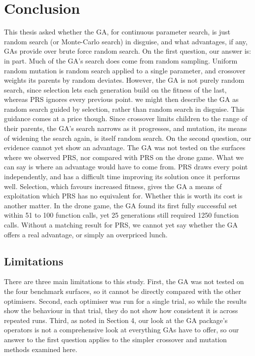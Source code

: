 \documentclass[
  a4paper,
]{article}
\newcommand{\+}{\phantom{-}}
\begin{document}
\section{Conclusion}\label{conclusion}

This thesis asked whether the GA, for continuous parameter search, is
just random search (or Monte-Carlo search) in disguise, and what
advantages, if any, GAs provide over brute force random search. On the
first question, our answer is: in part. Much of the GA's search does
come from random sampling. Uniform random mutation is random search
applied to a single parameter, and crossover weights its parents by
random deviates. However, the GA is not purely random search, since
selection lets each generation build on the fitness of the last, whereas
PRS ignores every previous point. we might then describe the GA as
random search guided by selection, rather than random search in
disguise. This guidance comes at a price though. Since crossover limits
children to the range of their parents, the GA's search narrows as it
progresses, and mutation, its means of widening the search again, is
itself random search. On the second question, our evidence cannot yet
show an advantage. The GA was not tested on the surfaces where we
observed PRS, nor compared with PRS on the drone game. What we can say
is where an advantage would have to come from. PRS draws every point
independently, and has a difficult time improving its solution once it
performs well. Selection, which favours increased fitness, gives the GA
a means of exploitation which PRS has no equivalent for. Whether this is
worth its cost is another matter. In the drone game, the GA found its
first fully successful set within 51 to 100 function calls, yet 25
generations still required 1250 function calls. Without a matching
result for PRS, we cannot yet say whether the GA offers a real
advantage, or simply an overpriced lunch.

\subsection{Limitations}\label{limitations}

There are three main limitations to this study. First, the GA was not
tested on the four benchmark surfaces, so it cannot be directly compared
with the other optimisers. Second, each optimiser was run for a single
trial, so while the results show the behaviour in that trial, they do
not show how consistent it is across repeated runs. Third, as noted in
Section 4, our look at the GA package's operators is not a comprehensive
look at everything GAs have to offer, so our answer to the first
question applies to the simpler crossover and mutation methods examined
here.
\end{document}
